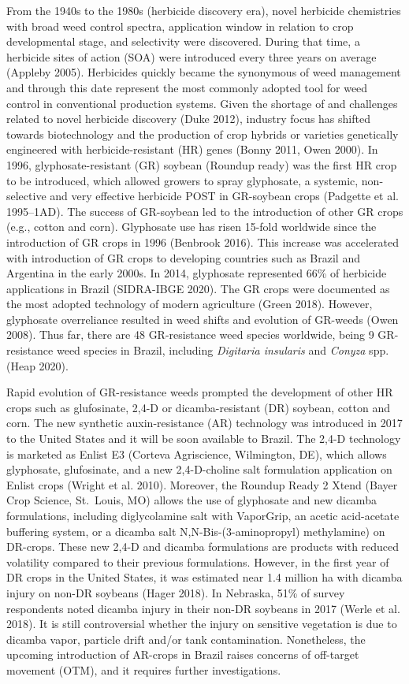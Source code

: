 \documentclass[
  12pt,
  a4paper]{article}
\begin{document}
From the 1940s to the 1980s (herbicide discovery era), novel herbicide
chemistries with broad weed control spectra, application window in
relation to crop developmental stage, and selectivity were discovered.
During that time, a herbicide sites of action (SOA) were introduced
every three years on average (Appleby 2005). Herbicides quickly became
the synonymous of weed management and through this date represent the
most commonly adopted tool for weed control in conventional production
systems. Given the shortage of and challenges related to novel herbicide
discovery (Duke 2012), industry focus has shifted towards biotechnology
and the production of crop hybrids or varieties genetically engineered
with herbicide-resistant (HR) genes (Bonny 2011, Owen 2000). In 1996,
glyphosate-resistant (GR) soybean (Roundup ready) was the first HR crop
to be introduced, which allowed growers to spray glyphosate, a systemic,
non-selective and very effective herbicide POST in GR-soybean crops
(Padgette et al. 1995--1AD). The success of GR-soybean led to the
introduction of other GR crops (e.g., cotton and corn). Glyphosate use
has risen 15-fold worldwide since the introduction of GR crops in 1996
(Benbrook 2016). This increase was accelerated with introduction of GR
crops to developing countries such as Brazil and Argentina in the early
2000s. In 2014, glyphosate represented 66\% of herbicide applications in
Brazil (SIDRA-IBGE 2020). The GR crops were documented as the most
adopted technology of modern agriculture (Green 2018). However,
glyphosate overreliance resulted in weed shifts and evolution of
GR-weeds (Owen 2008). Thus far, there are 48 GR-resistance weed species
worldwide, being 9 GR-resistance weed species in Brazil, including
\emph{Digitaria insularis} and \emph{Conyza} spp. (Heap 2020).

Rapid evolution of GR-resistance weeds prompted the development of other
HR crops such as glufosinate, 2,4-D or dicamba-resistant (DR) soybean,
cotton and corn. The new synthetic auxin-resistance (AR) technology was
introduced in 2017 to the United States and it will be soon available to
Brazil. The 2,4-D technology is marketed as Enlist E3 (Corteva
Agriscience, Wilmington, DE), which allows glyphosate, glufosinate, and
a new 2,4-D-choline salt formulation application on Enlist crops (Wright
et al. 2010). Moreover, the Roundup Ready 2 Xtend (Bayer Crop Science,
St.~Louis, MO) allows the use of glyphosate and new dicamba
formulations, including diglycolamine salt with VaporGrip, an acetic
acid-acetate buffering system, or a dicamba salt N,N-Bis-(3-aminopropyl)
methylamine) on DR-crops. These new 2,4-D and dicamba formulations are
products with reduced volatility compared to their previous
formulations. However, in the first year of DR crops in the United
States, it was estimated near 1.4 million ha with dicamba injury on
non-DR soybeans (Hager 2018). In Nebraska, 51\% of survey respondents
noted dicamba injury in their non-DR soybeans in 2017 (Werle et al.
2018). It is still controversial whether the injury on sensitive
vegetation is due to dicamba vapor, particle drift and/or tank
contamination. Nonetheless, the upcoming introduction of AR-crops in
Brazil raises concerns of off-target movement (OTM), and it requires
further investigations.
\end{document}
